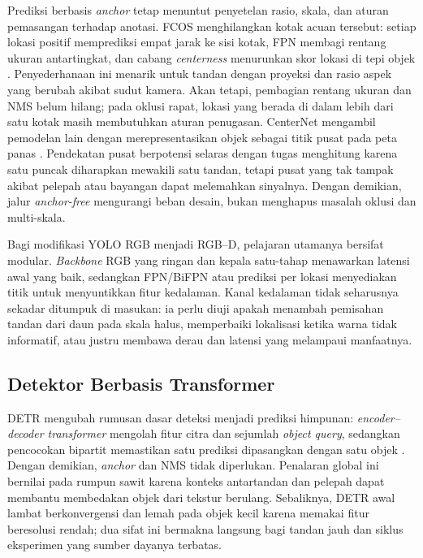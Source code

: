 Prediksi berbasis \textit{anchor} tetap menuntut penyetelan rasio, skala, dan aturan pemasangan terhadap anotasi. FCOS menghilangkan kotak acuan tersebut: setiap lokasi positif memprediksi empat jarak ke sisi kotak, FPN membagi rentang ukuran antartingkat, dan cabang \textit{centerness} menurunkan skor lokasi di tepi objek \cite{tian2019fcos}. Penyederhanaan ini menarik untuk tandan dengan proyeksi dan rasio aspek yang berubah akibat sudut kamera. Akan tetapi, pembagian rentang ukuran dan NMS belum hilang; pada oklusi rapat, lokasi yang berada di dalam lebih dari satu kotak masih membutuhkan aturan penugasan. CenterNet mengambil pemodelan lain dengan merepresentasikan objek sebagai titik pusat pada peta panas \cite{zhou2019objects}. Pendekatan pusat berpotensi selaras dengan tugas menghitung karena satu puncak diharapkan mewakili satu tandan, tetapi pusat yang tak tampak akibat pelepah atau bayangan dapat melemahkan sinyalnya. Dengan demikian, jalur \textit{anchor-free} mengurangi beban desain, bukan menghapus masalah oklusi dan multi-skala.

Bagi modifikasi YOLO RGB menjadi RGB--D, pelajaran utamanya bersifat modular. \textit{Backbone} RGB yang ringan dan kepala satu-tahap menawarkan latensi awal yang baik, sedangkan FPN/BiFPN atau prediksi per lokasi menyediakan titik untuk menyuntikkan fitur kedalaman. Kanal kedalaman tidak seharusnya sekadar ditumpuk di masukan: ia perlu diuji apakah menambah pemisahan tandan dari daun pada skala halus, memperbaiki lokalisasi ketika warna tidak informatif, atau justru membawa derau dan latensi yang melampaui manfaatnya.

\subsection{Detektor Berbasis Transformer}
DETR mengubah rumusan dasar deteksi menjadi prediksi himpunan: \textit{encoder--decoder transformer} mengolah fitur citra dan sejumlah \textit{object query}, sedangkan pencocokan bipartit memastikan satu prediksi dipasangkan dengan satu objek \cite{carion2020detr}. Dengan demikian, \textit{anchor} dan NMS tidak diperlukan. Penalaran global ini bernilai pada rumpun sawit karena konteks antartandan dan pelepah dapat membantu membedakan objek dari tekstur berulang. Sebaliknya, DETR awal lambat berkonvergensi dan lemah pada objek kecil karena memakai fitur beresolusi rendah; dua sifat ini bermakna langsung bagi tandan jauh dan siklus eksperimen yang sumber dayanya terbatas.

